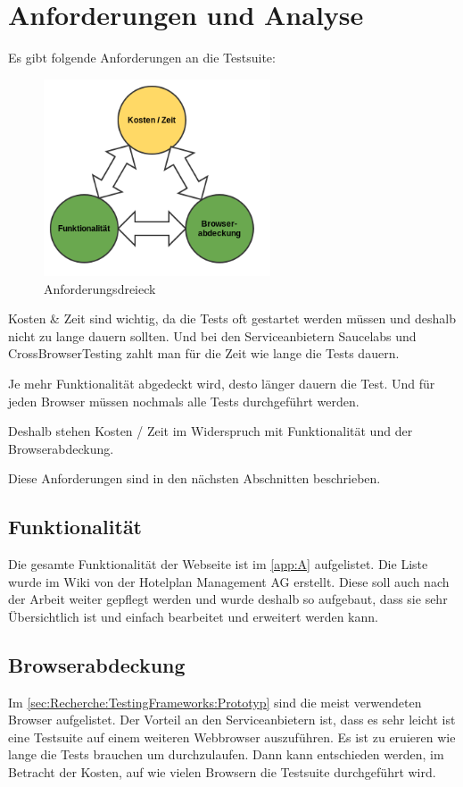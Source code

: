 

\chapter{Anforderungen und Analyse}
\label{sec:analyse}
Es gibt folgende Anforderungen an die Testsuite:
\begin{figure}[H]
	\centering
	\includegraphics[width=0.6\textwidth]{images/triangle.png}
	\caption{Anforderungsdreieck}
	\label{fig:analyse:Anforderungsdreieck}
\end{figure}

Kosten \& Zeit sind wichtig, da die Tests oft gestartet werden müssen und deshalb nicht zu lange dauern sollten. Und bei den Serviceanbietern Saucelabs und CrossBrowserTesting zahlt man für die Zeit wie lange die Tests dauern.

Je mehr Funktionalität abgedeckt wird, desto länger dauern die Test. Und für jeden Browser müssen nochmals alle Tests durchgeführt werden. 

Deshalb stehen Kosten / Zeit im Widerspruch mit Funktionalität und der Browserabdeckung.

Diese Anforderungen sind in den nächsten Abschnitten beschrieben.

\section{Funktionalität}
Die gesamte Funktionalität der Webseite ist im \cref{app:A}  aufgelistet. Die Liste wurde im Wiki von der Hotelplan Management AG erstellt. Diese soll auch nach der Arbeit weiter gepflegt werden und wurde deshalb so aufgebaut, dass sie sehr Übersichtlich ist und einfach bearbeitet und erweitert werden kann.

\section{Browserabdeckung}
Im \cref{sec:Recherche:TestingFrameworks:Prototyp}  sind die meist verwendeten Browser aufgelistet. Der Vorteil an den Serviceanbietern ist, dass es sehr leicht ist eine Testsuite auf einem weiteren Webbrowser auszuführen. Es ist zu eruieren wie lange die Tests brauchen um durchzulaufen. Dann kann entschieden werden, im Betracht der Kosten, auf wie vielen Browsern die Testsuite durchgeführt wird.

